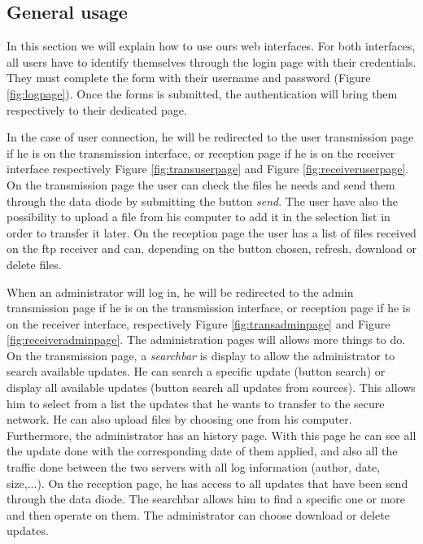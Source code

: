 \documentclass[a4paper,10pt]{article}
\begin{document}
\subsection{General usage}
In this section we will explain how to use  ours web interfaces.
For both interfaces, all users have to identify themselves through the login page with their credentials. They must complete the form with their username and password (Figure \ref{fig:logpage}). Once the forms is submitted, the authentication will bring them respectively to their dedicated page. 

In the case of user connection, he will be redirected to the user transmission page if he is on the transmission interface, or reception page if he is on the receiver interface respectively Figure \ref{fig:transuserpage} and Figure \ref{fig:receiveruserpage}. On the transmission page the user can check the files he needs and send them through the data diode by submitting the button \textit{send}. The user have also the possibility to upload a file from his computer to add it in the selection list in order to transfer it later. On the reception page the user has a list of files received on the ftp receiver and can, depending on the button chosen, refresh, download or delete files. 


When an administrator will log in, he will be redirected to the admin transmission page if he is on the transmission interface, or reception page if he is on the receiver interface, respectively Figure \ref{fig:transadminpage} and Figure \ref{fig:receiveradminpage}. The administration pages will allows more things to do. On the transmission page, a \textit{searchbar} is display to allow the administrator to search available updates. He can search a specific update (button search) or display all available updates (button search all updates from sources). This allows him to select from a list the updates that he wants to transfer to the secure network. He can also upload files by choosing one from his computer. 
Furthermore, the administrator has an history page. With this page he can see all the update done with the corresponding date of them applied, and also all the traffic done between the two servers with all log information (author, date, size,...).
On the reception page, he has access to all updates that have been send through the data diode. The searchbar allows him to find a specific one or more and then operate on them. The administrator can choose download or delete updates.\\ 
\end{document}
